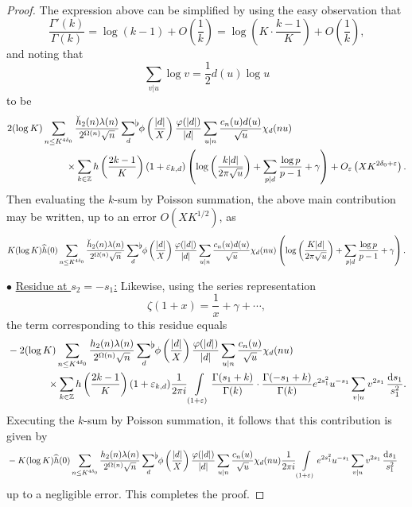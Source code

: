 \documentclass[10pt,a4paper]{amsart}
\newcommand\Z{\mathbb{Z}}
\newcommand\eps{\varepsilon}
\newcommand{\sumflat}{\mathop{{\sum}^{\raisebox{-3pt}{\makebox[0pt][l]{$\flat$}}}}}
\begin{document}
\begin{proof}
The expression above can be simplified by using the easy observation that 
\[\frac{\Gamma'(k)}{\Gamma(k)}=\log(k-1)+O\left(\frac 1k\right)=\log\left(K\cdot\frac{k-1}K\right)+O\left(\frac 1k\right),
\]
and noting that 
\[ 
\sum_{v|u}\log v=\frac12 d(u)\log u\]
to be
\begin{align*}
&2(\log K)\sum_{n\leq K^{4\delta_0}}\frac{\breve h_2(n)\lambda(n)}{2^{\Omega(n)}\sqrt n}\sumflat_{d}\,\phi\left(\frac{|d|}X\right)\frac{\varphi(|d|)}{|d|}\sum_{u|n}\frac{c_n(u)d(u)}{\sqrt u}\chi_d(nu)\\
&\qquad\qquad\qquad\times\sum_{k\in\Z}h\left(\frac{2k-1}K\right)(1+\varepsilon_{k,d})\left(\log\left(\frac{k|d|}{2\pi\sqrt u}\right)+\sum_{p|d}\frac{\log p}{p-1}+\gamma\right)+O_\eps\left(XK^{2\delta_0+\eps} \right).
\end{align*}
Then evaluating the $k$-sum by Poisson summation, the above main contribution may be written, up to an error $O(XK^{1/2})$, as
\begin{align*}
K(\log K)\widehat h(0)\sum_{n\leq K^{4\delta_0}}\frac{\breve h_2(n)\lambda(n)}{2^{\Omega(n)}\sqrt n}\sumflat_{d}\,\phi\left(\frac{|d|}X\right)\frac{\varphi(|d|)}{|d|}\sum_{u|n}\frac{c_n(u)d(u)}{\sqrt u}\chi_d(nu)\left(\log\left(\frac{K|d|}{2\pi\sqrt u}\right)+\sum_{p|d}\frac{\log p}{p-1}+\gamma\right).
\end{align*}

\noindent $\bullet$ \underline{Residue at $s_2=-s_1$:} Likewise, using the series representation 
\[\zeta(1+x)=\frac1{x}+\gamma+\cdots,\]
the term corresponding to this residue equals 
\begin{align*}
&-2(\log K)\sum_{n\leq K^{4\delta_0}}\frac{h_2(n)\lambda(n)}{2^{\Omega(n)}\sqrt n}\sumflat_{d}\,\phi\left(\frac{|d|}X\right)\frac{\varphi(|d|)}{|d|}\sum_{u|n}\frac{c_n(u)}{\sqrt u}\chi_d(nu)\\
&\qquad\qquad\times\sum_{k\in\Z}h\left(\frac{2k-1}K\right)(1+\varepsilon_{k,d})\frac1{2\pi i}\int\limits_{(1+\eps)}\frac{\Gamma(s_1+k)}{\Gamma(k)}\cdot\frac{\Gamma(-s_1+k)}{\Gamma(k)}e^{2s_1^2}u^{-s_1}\sum_{v|u}v^{2s_1}\,\frac{\mathrm d s_1}{s_1^2}. 
\end{align*}
Executing the $k$-sum by Poisson summation, it follows that this contribution is given by  
\begin{align}\label{diagonal-second-part}
&-K(\log K)\widehat h(0)\sum_{n\leq K^{4\delta_0}}\frac{h_2(n)\lambda(n)}{2^{\Omega(n)}\sqrt n}\sumflat_{d}\,\phi\left(\frac{|d|}X\right)\frac{\varphi(|d|)}{|d|}\sum_{u|n}\frac{c_n(u)}{\sqrt u}\chi_d(nu)\frac1{2\pi i}\int\limits_{(1+\eps)}e^{2s_1^2}u^{-s_1}\sum_{v|u}v^{2s_1}\,\frac{\mathrm d s_1}{s_1^2}
\end{align}
up to a negligible error. This completes the proof.
\end{proof}
\end{document}
